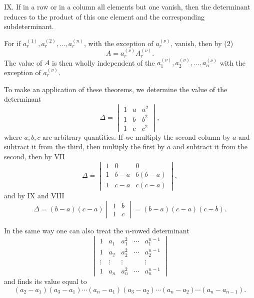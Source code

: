 \documentclass[11pt]{article}
\begin{document}
IX. If in a row or in a column all elements but one vanish, then the determinant reduces to the product of this one element and the corresponding subdeterminant.

For if \(a_r^{(1)},a_r^{(2)},\ldots,a_r^{(n)}\), with the exception of \(a_r^{(\nu)}\), vanish, then by (2)
\[
 A=a_r^{(\nu)}A_r^{(\nu)}.
\]
The value of \(A\) is then wholly independent of the \(a_1^{(\nu)},a_2^{(\nu)},\ldots,a_n^{(\nu)}\) with the exception of \(a_r^{(\nu)}\).

To make an application of these theorems, we determine the value of the determinant
\[
 \Delta=
 \begin{vmatrix}
 1&a&a^2\\
 1&b&b^2\\
 1&c&c^2
 \end{vmatrix},
\]
where \(a,b,c\) are arbitrary quantities. If we multiply the second column by \(a\) and subtract it from the third, then multiply the first by \(a\) and subtract it from the second, then by VII
\[
 \Delta=
 \begin{vmatrix}
 1&0&0\\
 1&b-a&b(b-a)\\
 1&c-a&c(c-a)
 \end{vmatrix},
\]
and by IX and VIII
\begin{equation}
 \Delta=(b-a)(c-a)
 \begin{vmatrix}
 1&b\\
 1&c
 \end{vmatrix}
 =(b-a)(c-a)(c-b).
\tag{10}
\end{equation}

In the same way one can also treat the \(n\)-rowed determinant
\[
\begin{vmatrix}
1&a_1&a_1^2&\cdots&a_1^{n-1}\\
1&a_2&a_2^2&\cdots&a_2^{n-1}\\
\vdots&\vdots&\vdots&&\vdots\\
1&a_n&a_n^2&\cdots&a_n^{n-1}
\end{vmatrix}
\]
and finds its value equal to
\begin{equation}
 (a_2-a_1)(a_3-a_1)\cdots(a_n-a_1)
 (a_3-a_2)\cdots(a_n-a_2)\cdots(a_n-a_{n-1}).
\tag{11}
\end{equation}
\end{document}

